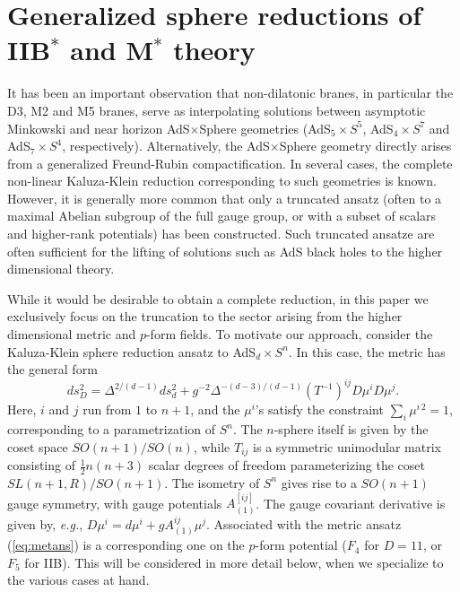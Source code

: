 \documentclass[a4paper,12pt]{article}
\newcommand{\fft}[2]{{\frac{#1}{#2}}}
\begin{document}
\section{Generalized sphere reductions of IIB$^*$ and M$^*$ theory}

It has been an important observation that non-dilatonic branes, in
particular the D3, M2 and M5 branes, serve as interpolating solutions
between asymptotic Minkowski and near horizon AdS$\times$Sphere
geometries (AdS$_5\times S^5$, AdS$_4\times S^7$ and AdS$_7\times S^4$,
respectively).  Alternatively, the AdS$\times$Sphere geometry directly
arises from a generalized Freund-Rubin compactification.  In several
cases, the complete non-linear Kaluza-Klein reduction corresponding to
such geometries is known.  However, it is generally more common that only
a truncated ansatz (often to a maximal Abelian subgroup of the full gauge
group, or with a subset of scalars and higher-rank potentials) has been
constructed.  Such truncated ansatze are often sufficient for the lifting
of solutions such as AdS black holes to the higher dimensional
theory.  

While it would be desirable to obtain a complete reduction, in this
paper we exclusively focus on the truncation to the sector arising from
the higher dimensional metric and $p$-form fields.  To motivate our
approach, consider the Kaluza-Klein sphere reduction ansatz to
AdS$_d\times S^n$.  In this case, the metric has the
general form \cite{Cvetic:1999xx,Cvetic:2000eb,Cvetic2}
%
\begin{equation}
ds_D^2=\Delta^{2/(d-1)}ds_d^2+g^{-2}\Delta^{-(d-3)/(d-1)}(T^{-1})^{ij}
D\mu^iD\mu^j.
\label{eq:metans}
\end{equation}
%
Here, $i$ and $j$ run from $1$ to $n+1$, and the $\mu^i$'s satisfy
the constraint $\sum_i\mu^{i\,2}=1$, corresponding to a parametrization
of $S^n$.  The $n$-sphere itself is given by the coset space
$SO(n+1)/SO(n)$, while $T_{ij}$ is a symmetric unimodular matrix
consisting of $\fft12n(n+3)$ scalar degrees of freedom parameterizing the
coset $SL(n+1,R)/SO(n+1)$.  The isometry of $S^n$ gives rise to a
$SO(n+1)$ gauge symmetry, with gauge potentials $A_{(1)}^{[ij]}$.  The
gauge covariant derivative is given by, {\it e.g.},
$D\mu^i=d\mu^i+gA_{(1)}^{ij}\mu^j$.  Associated with the metric ansatz
(\ref{eq:metans}) is a corresponding one on the $p$-form potential
($F_{4}$ for $D=11$, or $F_{5}$ for IIB).  This will be considered in
more detail below, when we specialize to the various cases at hand.
\end{document}
